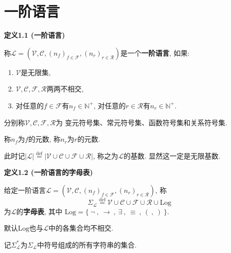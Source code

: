 \documentclass[UTF8]{ctexart}
\begin{document}
\setlength{\abovedisplayskip}{1pt}
\setlength{\belowdisplayskip}{1pt}

\section{一阶语言}

\hypertarget{sec:定义1.1}{}
\noindent\textbf{定义1.1 (一阶语言)}

称$\mathcal{L}=(\mathcal{V},\mathcal{C},
(n_f)_{f\in\mathcal{F}},(n_r)_{r\in\mathcal{R}})$是一个\textbf{一阶语言}, 如果:
\begin{enumerate}
    \item $\mathcal{V}$是无限集,
    \item $\mathcal{V},\mathcal{C},\mathcal{F},\mathcal{R}$两两不相交,
    \item 对任意的$f\in\mathcal{F}$有$n_f\in\mathbb{N}^+$,
    对任意的$r\in\mathcal{R}$有$n_r\in\mathbb{N}^+$.
\end{enumerate}

\vspace{10pt}

分别称$\mathcal{V},\mathcal{C},\mathcal{F},\mathcal{R}$为
变元符号集、常元符号集、函数符号集和关系符号集.

称$n_f$为$f$的元数, 称$n_r$为$r$的元数.

\vspace{10pt}

此时记$|\mathcal{L}|\overset{\mathrm{def}}{=}
|\mathcal{V}\cup\mathcal{C}\cup\mathcal{F}\cup\mathcal{R}|$,
称之为$\mathcal{L}$的基数. 显然这一定是无限基数.

\vspace{10pt}

\hypertarget{sec:定义1.2}{}
\noindent\textbf{定义1.2 (一阶语言的字母表)}

给定一阶语言$\mathcal{L}=(\mathcal{V},\mathcal{C},
(n_f)_{f\in\mathcal{F}},(n_r)_{r\in\mathcal{R}})$, 称
\[
    \Sigma_{\mathcal{L}}\overset{\mathrm{def}}{=}
    \mathcal{V}\cup\mathcal{C}\cup\mathcal{F}\cup\mathcal{R}\cup\mathrm{Log}
\]
为$\mathcal{L}$的\textbf{字母表}, 其中
$\mathrm{Log}=\{\ \neg\ ,\ \to\ ,\ \exists\ ,\ \equiv\ ,\ (\ ,\ )\ \}$.

默认$\mathrm{Log}$也与$\mathcal{L}$中的各集合均不相交.

\vspace{10pt}

记$\Sigma_{\mathcal{L}}^*$为$\Sigma_{\mathcal{L}}$中符号组成的所有字符串的集合.

\vspace{10pt}
\end{document}
